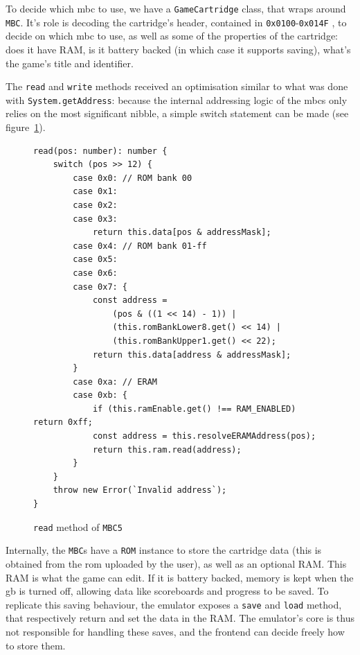 \documentclass[11pt]{informatics-report}
\begin{document}
To decide which \gls{mbc} to use, we have a \texttt{GameCartridge} class, that wraps around \texttt{MBC}. It's role is decoding the cartridge's header, contained in \texttt{0x0100}-\texttt{0x014F} \cite[The Cartridge Header]{pandoc}, to decide on which \gls{mbc} to use, as well as some of the properties of the cartridge: does it have RAM, is it battery backed (in which case it supports saving), what's the game's title and identifier.

The \texttt{read} and \texttt{write} methods received an optimisation similar to what was done with \texttt{System.getAddress}: because the internal addressing logic of the \glspl{mbc} only relies on the most significant nibble, a simple switch statement can be made (see figure~\ref{fig:mbc-read-switch}).

\begin{figure}[h]
    \begin{verbatim}
read(pos: number): number {
    switch (pos >> 12) {
        case 0x0: // ROM bank 00
        case 0x1:
        case 0x2:
        case 0x3:
        	return this.data[pos & addressMask];
        case 0x4: // ROM bank 01-ff
        case 0x5:
        case 0x6:
        case 0x7: {
            const address =
                (pos & ((1 << 14) - 1)) |
                (this.romBankLower8.get() << 14) |
                (this.romBankUpper1.get() << 22);
            return this.data[address & addressMask];
        }
        case 0xa: // ERAM
        case 0xb: {
            if (this.ramEnable.get() !== RAM_ENABLED) return 0xff;
            const address = this.resolveERAMAddress(pos);
            return this.ram.read(address);
        }
    }
    throw new Error(`Invalid address`);
}
    \end{verbatim}
    \caption{\texttt{read} method of \texttt{MBC5} \cite[MBC5]{pandoc}}
    \label{fig:mbc-read-switch}
\end{figure}

Internally, the \texttt{MBC}s have a \texttt{ROM} instance to store the cartridge data (this is obtained from the \gls{rom} uploaded by the user), as well as an optional RAM. This RAM is what the game can edit. If it is battery backed, memory is kept when the \gls{gb} is turned off, allowing data like scoreboards and progress to be saved. To replicate this saving behaviour, the emulator exposes a \texttt{save} and \texttt{load} method, that respectively return and set the data in the RAM. The emulator's core is thus not responsible for handling these saves, and the frontend can decide freely how to store them.
\end{document}
